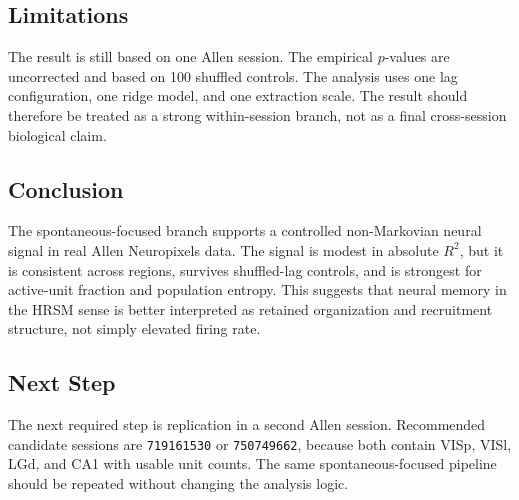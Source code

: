 \subsection{Limitations}

The result is still based on one Allen session. The empirical \(p\)-values are uncorrected and based on 100 shuffled controls. The analysis uses one lag configuration, one ridge model, and one extraction scale. The result should therefore be treated as a strong within-session branch, not as a final cross-session biological claim.

\subsection{Conclusion}

The spontaneous-focused branch supports a controlled non-Markovian neural signal in real Allen Neuropixels data. The signal is modest in absolute \(R^2\), but it is consistent across regions, survives shuffled-lag controls, and is strongest for active-unit fraction and population entropy. This suggests that neural memory in the HRSM sense is better interpreted as retained organization and recruitment structure, not simply elevated firing rate.

\subsection{Next Step}

The next required step is replication in a second Allen session. Recommended candidate sessions are \texttt{719161530} or \texttt{750749662}, because both contain VISp, VISl, LGd, and CA1 with usable unit counts. The same spontaneous-focused pipeline should be repeated without changing the analysis logic.
